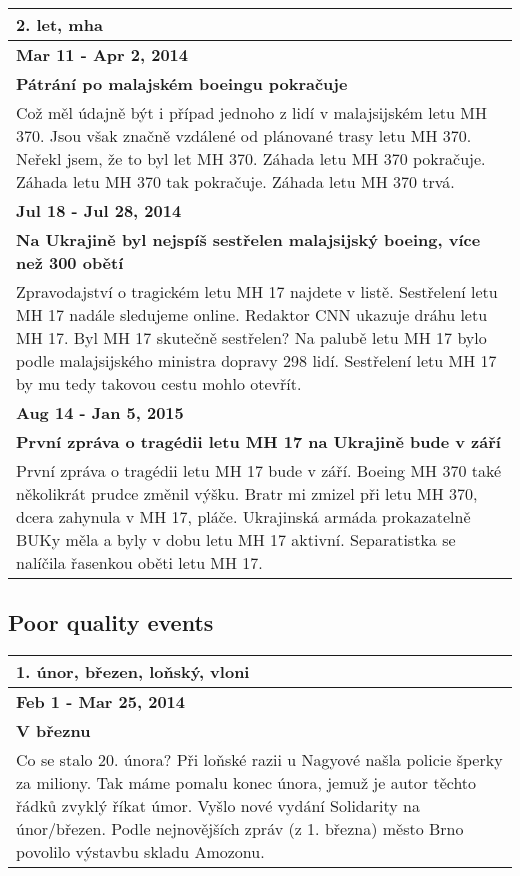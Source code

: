 \hspace{\fill}

\begin{tabularx}{\linewidth}{p{\linewidth}} \toprule[1.5pt]

\bf 2. let, mha \\ \midrule
\bf Mar 11 - Apr 2, 2014 \\ \midrule
\bf Pátrání po malajském boeingu pokračuje \\
Což měl údajně být i případ jednoho z lidí v malajsijském letu MH 370. Jsou však značně vzdálené od plánované trasy letu MH 370. Neřekl jsem, že to byl let MH 370. Záhada letu MH 370 pokračuje. Záhada letu MH 370 tak pokračuje. Záhada letu MH 370 trvá. \\ \bottomrule[1.25pt]

\bf Jul 18 - Jul 28, 2014 \\ \midrule
\bf Na Ukrajině byl nejspíš sestřelen malajsijský boeing, více než 300 obětí \\
Zpravodajství o tragickém letu MH 17 najdete v listě. Sestřelení letu MH 17 nadále sledujeme online. Redaktor CNN ukazuje dráhu letu MH 17. Byl MH 17 skutečně sestřelen? Na palubě letu MH 17 bylo podle malajsijského ministra dopravy 298 lidí. Sestřelení letu MH 17 by mu tedy takovou cestu mohlo otevřít. \\ \bottomrule[1.25pt]

\bf Aug 14 - Jan 5, 2015 \\ \midrule
\bf První zpráva o tragédii letu MH 17 na Ukrajině bude v září \\
První zpráva o tragédii letu MH 17 bude v září. Boeing MH 370 také několikrát prudce změnil výšku. Bratr mi zmizel při letu MH 370, dcera zahynula v MH 17, pláče. Ukrajinská armáda prokazatelně BUKy měla a byly v dobu letu MH 17 aktivní. Separatistka se nalíčila řasenkou oběti letu MH 17. \\ \bottomrule[1.25pt]

\end{tabularx}

\hspace{\fill}
\newpage

\subsection*{Poor quality events}
\begin{tabularx}{\linewidth}{p{\linewidth}} \toprule[1.5pt]

\bf 1. únor, březen, loňský, vloni \\ \midrule
\bf Feb 1 - Mar 25, 2014 \\ \midrule
\bf V březnu \\
Co se stalo 20. února? Při loňské razii u Nagyové našla policie šperky za miliony. Tak máme pomalu konec února, jemuž je autor těchto řádků zvyklý říkat úmor. Vyšlo nové vydání Solidarity na únor/březen. Podle nejnovějších zpráv (z 1. března) město Brno povolilo výstavbu skladu Amozonu. \\ \bottomrule[1.25pt]
\end{tabularx}

